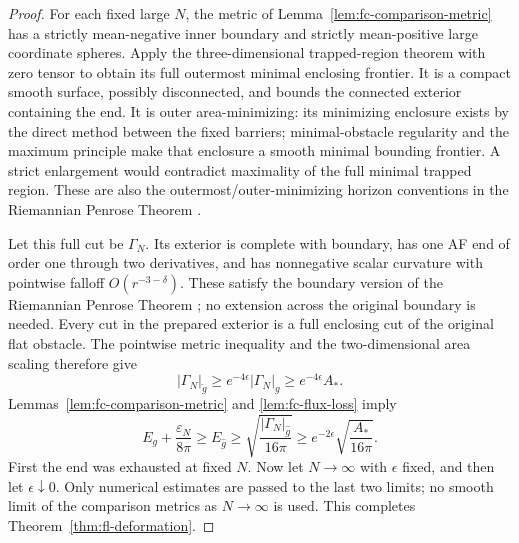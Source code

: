 \begin{proof}
For each fixed large $N$, the metric of
Lemma~\ref{lem:fc-comparison-metric} has a strictly mean-negative
inner boundary and strictly mean-positive large coordinate
spheres.  Apply the three-dimensional trapped-region theorem
with zero tensor to obtain its full outermost minimal enclosing
frontier.  It is a compact smooth surface, possibly disconnected,
and bounds the connected exterior containing the end.
It is outer area-minimizing: its minimizing enclosure exists by
the direct method between the fixed barriers; minimal-obstacle
regularity and the maximum principle make that enclosure a
smooth minimal bounding frontier.  A strict enlargement would
contradict maximality of the full minimal trapped region.
These are also the outermost/outer-minimizing horizon conventions
in the Riemannian Penrose Theorem \cite{bray2001,braylee2009}.

Let this full cut be $\Gamma_N$.  Its exterior is complete with
boundary, has one AF end of order one through two derivatives,
and has nonnegative scalar curvature with pointwise falloff
$O(r^{-3-\delta})$.  These satisfy the boundary version of the
Riemannian Penrose Theorem \cite[Theorem~1.4]{braylee2009}; no
extension across the original boundary is needed.  Every cut in
the prepared exterior is a full enclosing cut of the original
flat obstacle.  The pointwise metric inequality and the
two-dimensional area scaling therefore give
\[
 |\Gamma_N|_{\widehat g}
        \ge e^{-4\epsilon}|\Gamma_N|_g
        \ge e^{-4\epsilon}A_*.
\]
Lemmas~\ref{lem:fc-comparison-metric} and
\ref{lem:fc-flux-loss} imply
\[
 E_g+\frac{\varepsilon_N}{8\pi}
       \ge E_{\widehat g}
       \ge\sqrt{\frac{|\Gamma_N|_{\widehat g}}{16\pi}}
       \ge e^{-2\epsilon}\sqrt{\frac{A_*}{16\pi}}.
\]
First the end was exhausted at fixed $N$.
Now let $N\to\infty$ with $\epsilon$ fixed, and then let
$\epsilon\downarrow0$.  Only numerical estimates are passed to
the last two limits; no smooth limit of the comparison metrics
as $N\to\infty$ is used.  This completes
Theorem~\ref{thm:fl-deformation}.
\end{proof}
